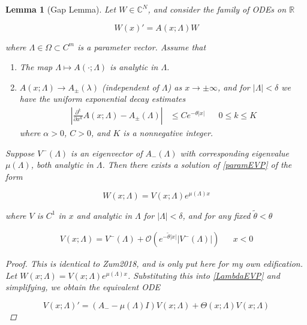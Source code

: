 \documentclass[12pt]{article}
\def\R{{\mathbb R}}
\def\C{{\mathbb C}}
\newtheorem{lemma}{Lemma}
\begin{document}
\begin{lemma}[Gap Lemma]\label{gaplemma}
Let $W \in \C^N$, and consider the family of ODEs on $\R$

\begin{equation}\label{LambdaEVP}
W(x)' = A(x; \Lambda) W
\end{equation}

where $\Lambda \in \Omega \subset C^m$ is a parameter vector. Assume that

\begin{enumerate}
	\item The map $\Lambda \mapsto A(\cdot; \Lambda)$ is analytic in $\Lambda$.
	\item $A(x; \Lambda) \rightarrow A_\pm(\lambda)$ (independent of $\Lambda$) as $x \rightarrow \pm \infty$, and for $|\Lambda| < \delta$ we have the uniform exponential decay estimates 
	\begin{align}
	\left| \frac{\partial^k}{\partial x^k} A(x; \Lambda) - A_\pm(\Lambda) \right| 
	&\leq C e^{-\theta |x|} && 0 \leq k \leq K
	\end{align}
	where $\alpha > 0$, $C > 0$, and $K$ is a nonnegative integer.
\end{enumerate}

Suppose $V^-(\Lambda)$ is an eigenvector of $A_-(\Lambda)$ with corresponding eigenvalue $\mu(\Lambda)$, both analytic in $\Lambda$. Then there exists a solution of \ref{paramEVP} of the form 

\begin{equation}
W(x; \Lambda) = V(x; \Lambda) e^{\mu(\Lambda)x}
\end{equation}

where $V$ is $C^1$ in $x$ and analytic in $\Lambda$ for $|\Lambda| < \delta$, and for any fixed $\tilde{\theta} < \theta$

\begin{align}
V(x; \Lambda) = V^-(\Lambda) + \mathcal{O}(e^{-\tilde{\theta}|x|}|V^-(\Lambda)|) && x < 0
\end{align}

\begin{proof}
This is identical to Zum2018, and is only put here for my own edification.\\

Let $W(x; \Lambda) = V(x; \Lambda) e^{\mu(\Lambda) x}$. Substituting this into \eqref{LambdaEVP} and simplifying, we obtain the equivalent ODE

\begin{equation}\label{VEVP}
V(x; \Lambda)' = (A_- - \mu(\Lambda)I)V(x; \Lambda) + \Theta(x; \Lambda) V(x; \Lambda)
\end{equation}


\end{proof}
\end{lemma}
\end{document}
